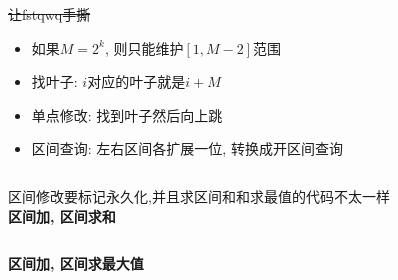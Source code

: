 \sout{让fstqwq手撕}

\begin{itemize}
	\item 如果$M = 2^k$, 则只能维护$[1, M - 2]$范围
	\item 找叶子: $i$对应的叶子就是$i + M$
	\item 单点修改: 找到叶子然后向上跳
	\item 区间查询: 左右区间各扩展一位, 转换成开区间查询
	\inputminted{cpp}{../src/datastructure/非递归线段树单点修改.cpp}

\end{itemize}
	
区间修改要标记永久化,并且求区间和和求最值的代码不太一样 \\

\textbf{区间加, 区间求和}
\inputminted{cpp}{../src/datastructure/非递归线段树区间加区间求和.cpp}

\textbf{区间加, 区间求最大值}
\inputminted{cpp}{../src/datastructure/非递归线段树区间加区间求最大值.cpp}